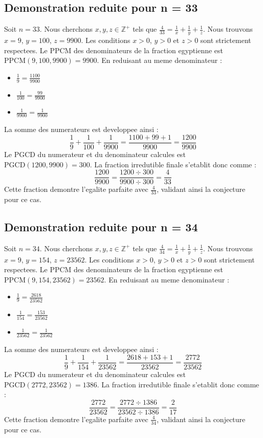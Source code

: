 \documentclass[11pt,a4paper]{article}
\begin{document}
\subsection{Demonstration reduite pour n = 33}
Soit $n = 33$. Nous cherchons $x, y, z \in \mathbb{Z}^{+}$ tels que $\frac{4}{33} = \frac{1}{x} + \frac{1}{y} + \frac{1}{z}$.
Nous trouvons $x = 9$, $y = 100$, $z = 9900$.
Les conditions $x > 0$, $y > 0$ et $z > 0$ sont strictement respectees.
Le PPCM des denominateurs de la fraction egyptienne est $\text{PPCM}(9, 100, 9900) = 9900$.
En reduisant au meme denominateur :
\begin{itemize}
    \item $\frac{1}{9} = \frac{1100}{9900}$
    \item $\frac{1}{100} = \frac{99}{9900}$
    \item $\frac{1}{9900} = \frac{1}{9900}$
\end{itemize}
La somme des numerateurs est developpee ainsi :
$$ \frac{1}{9} + \frac{1}{100} + \frac{1}{9900} = \frac{1100 + 99 + 1}{9900} = \frac{1200}{9900} $$
Le PGCD du numerateur et du denominateur calcules est $\text{PGCD}(1200, 9900) = 300$.
La fraction irredutible finale s'etablit donc comme :
$$ \frac{1200}{9900} = \frac{1200 \div 300}{9900 \div 300} = \frac{4}{33} $$
Cette fraction demontre l'egalite parfaite avec $\frac{4}{33}$, validant ainsi la conjecture pour ce cas.

\subsection{Demonstration reduite pour n = 34}
Soit $n = 34$. Nous cherchons $x, y, z \in \mathbb{Z}^{+}$ tels que $\frac{4}{34} = \frac{1}{x} + \frac{1}{y} + \frac{1}{z}$.
Nous trouvons $x = 9$, $y = 154$, $z = 23562$.
Les conditions $x > 0$, $y > 0$ et $z > 0$ sont strictement respectees.
Le PPCM des denominateurs de la fraction egyptienne est $\text{PPCM}(9, 154, 23562) = 23562$.
En reduisant au meme denominateur :
\begin{itemize}
    \item $\frac{1}{9} = \frac{2618}{23562}$
    \item $\frac{1}{154} = \frac{153}{23562}$
    \item $\frac{1}{23562} = \frac{1}{23562}$
\end{itemize}
La somme des numerateurs est developpee ainsi :
$$ \frac{1}{9} + \frac{1}{154} + \frac{1}{23562} = \frac{2618 + 153 + 1}{23562} = \frac{2772}{23562} $$
Le PGCD du numerateur et du denominateur calcules est $\text{PGCD}(2772, 23562) = 1386$.
La fraction irredutible finale s'etablit donc comme :
$$ \frac{2772}{23562} = \frac{2772 \div 1386}{23562 \div 1386} = \frac{2}{17} $$
Cette fraction demontre l'egalite parfaite avec $\frac{4}{34}$, validant ainsi la conjecture pour ce cas.
\end{document}

